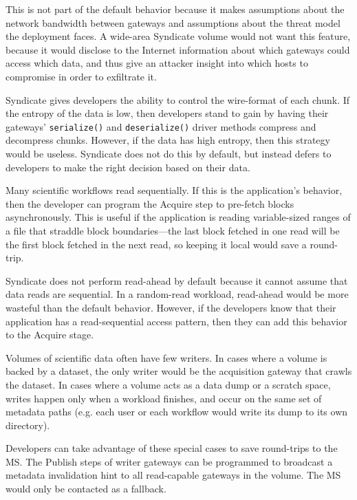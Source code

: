 This is not part of the default behavior because it makes assumptions about the
network bandwidth between gateways and assumptions about the threat model the
deployment faces.  A wide-area Syndicate volume would not want this feature,
because it would disclose to the Internet information about which gateways could
access which data, and thus give an attacker insight into which hosts
to compromise in order to exfiltrate it.


Syndicate gives developers the ability to control the wire-format of each chunk.
If the entropy of the data is low, then developers stand to gain by having their
gateways' \texttt{serialize()} and \texttt{deserialize()} driver methods
compress and decompress chunks.  However, if the data has high entropy, then
this strategy would be useless.  Syndicate does not do this by default, but
instead defers to developers to make the right decision based on their data.


Many scientific workflows read sequentially.  If this is the application's
behavior, then the developer can program the Acquire step to pre-fetch blocks
asynchronously.  This is useful if the application is reading
variable-sized ranges of a file that straddle block boundaries---the last block
fetched in one read will be the first block fetched in the next read, so keeping
it local would save a round-trip.

Syndicate does not perform read-ahead by
default because it cannot assume that data reads are sequential.  In a
random-read workload, read-ahead would be more wasteful than the default
behavior.  However, if  the developers know that their application has a
read-sequential access pattern, then they can add this behavior to the Acquire
stage.


Volumes of scientific data often have few writers.  In cases where a volume is
backed by a dataset, the only writer would be the acquisition gateway that
crawls the dataset.  In cases where a volume acts as a data dump or a scratch space,
writes happen only when a workload finishes, and occur on the same set of
metadata paths (e.g. each user or each workflow would write its dump to its own
directory).

Developers can take advantage of these special cases to save round-trips to the MS.
The Publish steps of writer gateways can be programmed to 
broadcast a metadata invalidation hint to all read-capable gateways in the
volume.  The MS would only be contacted as a fallback.

